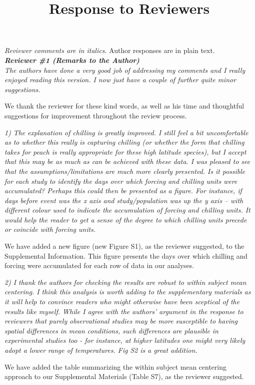 \documentclass{article}
\begin{document}
\setlength\parindent{0pt}


\title{Response to Reviewers}
\emph{Reviewer comments are in italics.} Author responses are in plain text.\\

\emph{{\bf Reviewer \#1 (Remarks to the Author)}}\\

\emph{The authors have done a very good job of addressing my comments and I really enjoyed reading this version. I now just have a couple of further quite minor suggestions.}
\par We thank the reviewer for these kind words, as well as his time and thoughtful suggestions for improvement throughout the review process.

\par \emph{1) The explanation of chilling is greatly improved. I still feel a bit uncomfortable as to whether this really is capturing chilling (or whether the form that chilling takes for peach is really appropriate for these high latitude species), but I accept that this may be as much as can be achieved with these data. I was pleased to see that the assumptions/limitations are much more clearly presented. Is it possible for each study to identify the days over which forcing and chilling units were accumulated? Perhaps this could then be presented as a figure. For instance, if days before event was the x axis and study/population was up the y axis – with different colour used to indicate the accumulation of forcing and chilling units. It would help the reader to get a sense of the degree to which chilling units precede or coincide with forcing units.} 
\par We have added a new figure (new Figure S1), as the reviewer suggested, to the Supplemental Information. This figure presents the days over which chilling and forcing were accumulated for each row of data in our analyses. 
\par \emph{2) I thank the authors for checking the results are robust to within subject mean centering. I think this analysis is worth adding to the supplementary materials as it will help to convince readers who might otherwise have been sceptical of the results like myself. While I agree with the authors' argument in the response to reviewers that purely observational studies may be more susceptible to having spatial differences in mean conditions, such differences are plausible in experimental studies too -  for instance, at higher latitudes one might very likely adopt a lower range of temperatures. Fig S2 is a great addition. }
\par We have added the table summarizing the within subject mean centering approach to our Supplemental Materials (Table S7), as the reviewer suggested.
\end{document}
